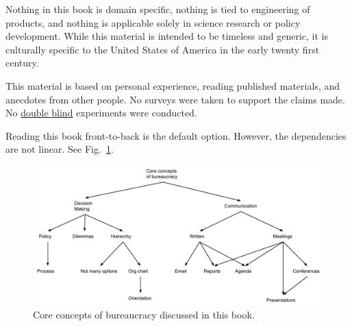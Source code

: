 


Nothing in this book is domain specific, nothing is tied to engineering of products, and nothing is applicable solely in science research or policy development. While this material is intended to be timeless and generic, it is culturally specific to the United States of America in the early twenty first century. %

This material is based on personal experience, reading published materials, and anecdotes from other people. No surveys were taken to support the claims made. No \href{https://en.wikipedia.org/wiki/Blinded_experiment}{double blind} experiments were conducted. 

Reading this book front-to-back is the default option. However, the dependencies are not linear. See Fig.~\ref{fig:core-concepts}.

\begin{figure}[ht]
    \centering
    \includegraphics[width=1\textwidth]{images/core_concepts_map.pdf}
    \caption{Core concepts of bureaucracy discussed in this book. }
    \label{fig:core-concepts}
\end{figure}

